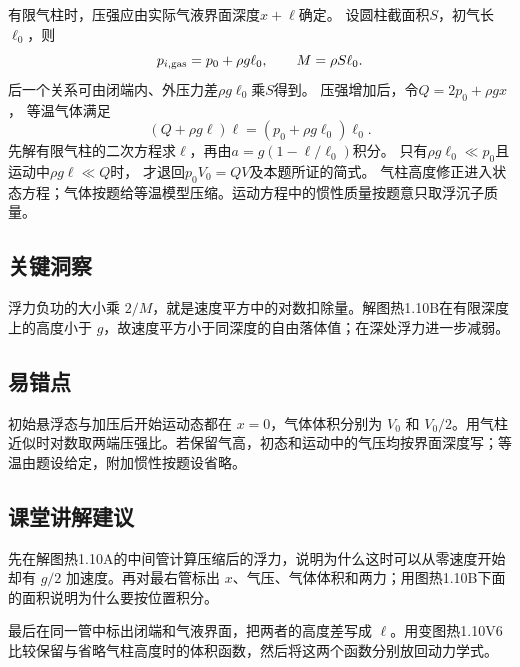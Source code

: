 \documentclass[UTF8,fontset=fandol,a4paper,11pt]{ctexart}
\begin{document}
有限气柱时，压强应由实际气液界面深度$x+\ell$确定。
设圆柱截面积$S$，初气长$\ell_0$，则
\[
p_{i,\rm gas}=p_0+\rho g\ell_0,\qquad
M=\rho S\ell_0.
\]
后一个关系可由闭端内、外压力差$\rho g\ell_0$乘$S$得到。
压强增加后，令$Q=2p_0+\rho gx$，
等温气体满足
\[
(Q+\rho g\ell)\ell=(p_0+\rho g\ell_0)\ell_0.
\]
先解有限气柱的二次方程求$\ell$，再由$a=g(1-\ell/\ell_0)$积分。
只有$\rho g\ell_0\ll p_0$且运动中$\rho g\ell\ll Q$时，
才退回$p_0V_0=QV$及本题所证的简式。
气柱高度修正进入状态方程；气体按题给等温模型压缩。运动方程中的惯性质量按题意只取浮沉子质量。




\subsection*{关键洞察}

浮力负功的大小乘 $2/M$，就是速度平方中的对数扣除量。解图热1.10B在有限深度上的高度小于 $g$，故速度平方小于同深度的自由落体值；在深处浮力进一步减弱。



\subsection*{易错点}

初始悬浮态与加压后开始运动态都在 $x=0$，气体体积分别为 $V_0$ 和 $V_0/2$。用气柱近似时对数取两端压强比。若保留气高，初态和运动中的气压均按界面深度写；等温由题设给定，附加惯性按题设省略。



\subsection*{课堂讲解建议}

先在解图热1.10A的中间管计算压缩后的浮力，说明为什么这时可以从零速度开始却有 $g/2$ 加速度。再对最右管标出 $x$、气压、气体体积和两力；用图热1.10B下面的面积说明为什么要按位置积分。

最后在同一管中标出闭端和气液界面，把两者的高度差写成 $\ell$。用变图热1.10V6比较保留与省略气柱高度时的体积函数，然后将这两个函数分别放回动力学式。


\end{document}
